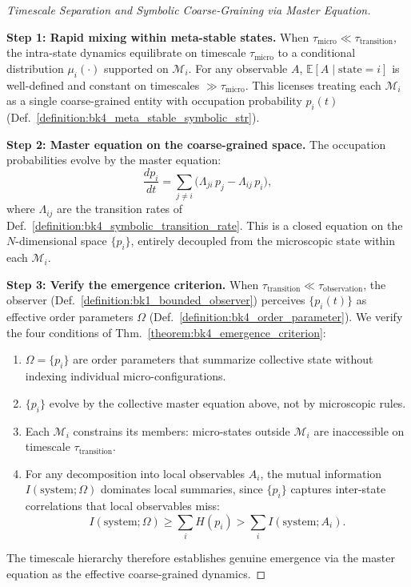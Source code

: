 \begin{proof}[Timescale Separation and Symbolic Coarse-Graining via Master Equation]
\label{proof:bk4_timescale_separation_hierarchy}
\leavevmode

\textbf{Step 1: Rapid mixing within meta-stable states.} When $\tau_{\text{micro}} \ll \tau_{\text{transition}}$, the intra-state dynamics equilibrate on timescale $\tau_{\text{micro}}$ to a conditional distribution $\mu_i(\cdot)$ supported on $\mathcal{M}_i$. For any observable $A$, $\mathbb{E}[A \mid \text{state} = i]$ is well-defined and constant on timescales $\gg \tau_{\text{micro}}$. This licenses treating each $\mathcal{M}_i$ as a single coarse-grained entity with occupation probability $p_i(t)$ (Def.~\ref{definition:bk4_meta_stable_symbolic_str}).

\textbf{Step 2: Master equation on the coarse-grained space.} The occupation probabilities evolve by the master equation:
\[
\frac{dp_i}{dt} = \sum_{j \neq i} \bigl(\Lambda_{ji}\,p_j - \Lambda_{ij}\,p_i\bigr),
\]
where $\Lambda_{ij}$ are the transition rates of Def.~\ref{definition:bk4_symbolic_transition_rate}. This is a closed equation on the $N$-dimensional space $\{p_i\}$, entirely decoupled from the microscopic state within each $\mathcal{M}_i$.

\textbf{Step 3: Verify the emergence criterion.}
When $\tau_{\text{transition}} \ll \tau_{\text{observation}}$, the observer
(Def.~\ref{definition:bk1_bounded_observer}) perceives $\{p_i(t)\}$ as effective
order parameters $\Omega$ (Def.~\ref{definition:bk4_order_parameter}).
We verify the four conditions of Thm.~\ref{theorem:bk4_emergence_criterion}:
\begin{enumerate}
    \item $\Omega = \{p_i\}$ are order parameters that summarize collective state
    without indexing individual micro-configurations.
    \item $\{p_i\}$ evolve by the collective master equation above, not by microscopic rules.
    \item Each $\mathcal{M}_i$ constrains its members: micro-states outside $\mathcal{M}_i$ are inaccessible on timescale $\tau_{\text{transition}}$.
    \item For any decomposition into local observables $A_i$, the mutual information
    $I(\text{system};\Omega)$ dominates local summaries, since $\{p_i\}$ captures
    inter-state correlations that local observables miss:
    \[
      I(\text{system};\Omega) \geq \sum_i H(p_i) > \sum_i I(\text{system};A_i).
    \]
\end{enumerate}
The timescale hierarchy therefore establishes genuine emergence via the master equation as the effective coarse-grained dynamics.
\end{proof}
